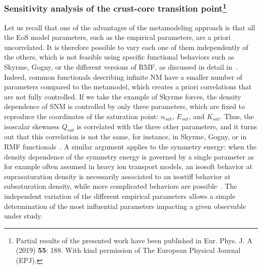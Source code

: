 \subsubsection{Sensitivity analysis of the crust-core transition
point\footnote{Partial results of the presented work have been published in 
Eur. Phys. J. A (2019) \textbf{55}: 188. With kind permission of The European
Physical Journal (EPJ).}}\label{subsubsec:sensana}

Let us recall that one of the advantages of the metamodeling approach is that 
all the EoS model parameters, such as the empirical parameters, are a priori
uncorrelated. 
It is therefore possible to vary each one of them independently of the others, 
which is not feasible using specific functional behaviors such as Skyrme, 
Gogny, or the different versions of RMF, as discussed in detail
in~\cite{Margueron2018a,Margueron2019}. 
Indeed, common functionals describing infinite NM have a smaller number of 
parameters compared to the metamodel, which creates a priori correlations that 
are not fully controlled. If we take the example of Skyrme forces, the density 
dependence of SNM is controlled by only three parameters, which are fixed 
to reproduce the coordinates of the saturation point: $n_{sat}$, $E_{sat}$, and 
$K_{sat}$. Thus, the isoscalar skewness $Q_{sat}$ is correlated with the 
three other parameters, and it turns out that this correlation is not the same, 
for instance, in Skyrme, Gogny, or in RMF functionals~\cite{Margueron2019}. A 
similar argument applies to the symmetry energy: when the density dependence of 
the symmetry energy is governed by a single parameter as for example often 
assumed in heavy ion 
transport models, an isosoft behavior at suprasaturation density is necessarily 
associated to an isostiff behavior at subsaturation density, while more 
complicated behaviors are possible~\cite{Margueron2019}. The independent 
variation of the different empirical parameters allows a simple determination 
of the most influential parameters impacting a given observable under study. 

